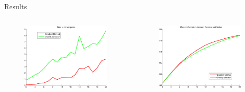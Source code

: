 \documentclass[11pt,mathserif]{beamer}
\begin{document}
\begin{frame}[t]{Results}
\begin{columns}[T]
	\begin{column}{.5\textwidth}

\begin{figure}
	\includegraphics[width=\columnwidth]{figures/Time_sensor.pdf}
\end{figure}
	\end{column}
	
	\begin{column}{.5\textwidth}
\begin{figure}
	\includegraphics[width=\columnwidth]{figures/MI_sensor.pdf}
\end{figure}
	\end{column}		
\end{columns}
\end{frame}
\end{document}
